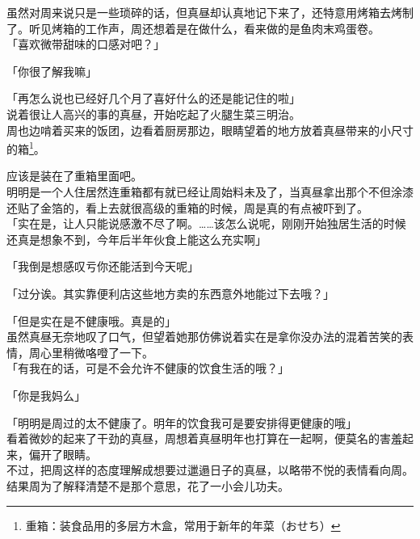 虽然对周来说只是一些琐碎的话，但真昼却认真地记下来了，还特意用烤箱去烤制了。听见烤箱的工作声，周还想着是在做什么，看来做的是鱼肉末鸡蛋卷。\\

「喜欢微带甜味的口感对吧？」

「你很了解我嘛」

「再怎么说也已经好几个月了喜好什么的还是能记住的啦」\\

说着很让人高兴的事的真昼，开始吃起了火腿生菜三明治。\\

周也边啃着买来的饭团，边看着厨房那边，眼睛望着的地方放着真昼带来的小尺寸的箱\footnote{重箱：装食品用的多层方木盒，常用于新年的年菜（{\jpfont おせち}）}。

应该是装在了重箱里面吧。\\

明明是一个人住居然连重箱都有就已经让周始料未及了，当真昼拿出那个不但涂漆还贴了金箔的，看上去就很高级的重箱的时候，周是真的有点被吓到了。\\

「实在是，让人只能说感激不尽了啊。……该怎么说呢，刚刚开始独居生活的时候还真是想象不到，今年后半年伙食上能这么充实啊」

「我倒是想感叹亏你还能活到今天呢」

「过分诶。其实靠便利店这些地方卖的东西意外地能过下去哦？」

「但是实在是不健康哦。真是的」\\

虽然真昼无奈地叹了口气，但望着她那仿佛说着实在是拿你没办法的混着苦笑的表情，周心里稍微咯噔了一下。\\

「有我在的话，可是不会允许不健康的饮食生活的哦？」

「你是我妈么」

「明明是周过的太不健康了。明年的饮食我可是要安排得更健康的哦」\\

看着微妙的起来了干劲的真昼，周想着真昼明年也打算在一起啊，便莫名的害羞起来，偏开了眼睛。\\

不过，把周这样的态度理解成想要过邋遢日子的真昼，以略带不悦的表情看向周。结果周为了解释清楚不是那个意思，花了一小会儿功夫。

